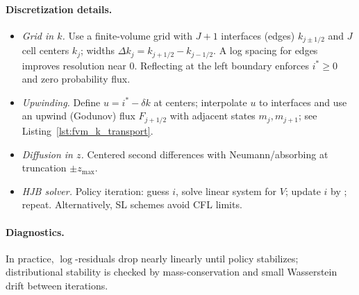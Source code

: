 ﻿\documentclass[11pt,letterpaper,oneside]{article}
\numberwithin{equation}{section}
\newcommand{\ac}[1]{{\mdseries\textsc{#1}}}
\newcommand{\1}{\mathbf{1}}
\begin{document}
\paragraph{Discretization details.}
\begin{itemize}[leftmargin=1.25em]
\item \emph{Grid in $k$.} Use a finite-volume grid with $J+1$ interfaces (edges) $k_{j\pm 1/2}$ and $J$ cell centers $k_j$; widths $\Delta k_j = k_{j+1/2}-k_{j-1/2}$. A log spacing for edges improves resolution near $0$. Reflecting at the left boundary enforces $i^*\!\ge 0$ and zero probability flux.
\item \emph{Upwinding.} Define $u=i^*-\delta k$ at centers; interpolate $u$ to interfaces and use an upwind (Godunov) flux $F_{j+1/2}$ with adjacent states $m_j,m_{j+1}$; see Listing~\ref{lst:fvm_k_transport}.
\item \emph{Diffusion in $z$.} Centered second differences with Neumann/absorbing at truncation $\pm z_{\max}$.
\item \emph{HJB solver.} Policy iteration: guess $i$, solve linear system for $V$; update $i$ by ; repeat. Alternatively, \ac{SL} schemes avoid CFL limits.
\end{itemize}

\paragraph{Diagnostics.} In practice, $\log$-residuals drop nearly linearly until policy stabilizes; distributional stability is checked by mass-conservation and small Wasserstein drift between iterations.
\end{document}
